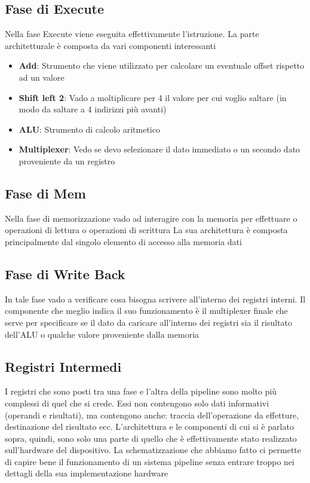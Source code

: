 \subsection{Fase di Execute}
Nella fase Execute viene eseguita effettivamente l'istruzione. La parte architetturale è composta da vari componenti interessanti
\begin{itemize}
    \item \textbf{Add}: Strumento che viene utilizzato per calcolare un eventuale offset rispetto ad un valore
    \item \textbf{Shift left 2}: Vado a moltiplicare per 4 il valore per cui voglio saltare (in modo da saltare a 4 indirizzi più avanti)
    \item \textbf{ALU}: Strumento di calcolo aritmetico
    \item \textbf{Multiplexer}: Vedo se devo selezionare il dato immediato o un secondo dato proveniente da un registro
\end{itemize}

\subsection{Fase di Mem}
Nella fase di memorizzazione vado ad interagire con la memoria per effettuare o operazioni di lettura o operazioni di scrittura
La sua architettura è composta principalmente dal singolo elemento di accesso alla memoria dati

\subsection{Fase di Write Back}
In tale fase vado a verificare cosa bisogna scrivere all'interno dei registri interni. Il componente che meglio indica il suo funzionamento è il multiplexer finale che serve per specificare se il dato da caricare all'interno dei registri sia il risultato dell'ALU o qualche valore proveniente dalla memoria

\subsection{Registri Intermedi}
I registri che sono posti tra una fase e l'altra della pipeline sono molto più complessi di quel che si crede. Essi non contengono solo dati informativi (operandi e risultati), ma contengono anche: traccia dell'operazione da effetture, destinazione del risultato ecc. 
L'architettura e le componenti di cui si è parlato sopra, quindi, sono solo una parte di quello che è effettivamente stato realizzato sull'hardware del dispositivo.
La schematizzazione che abbiamo fatto ci permette di capire bene il funzionamento di un sistema pipeline senza entrare troppo nei dettagli della sua implementazione hardware

